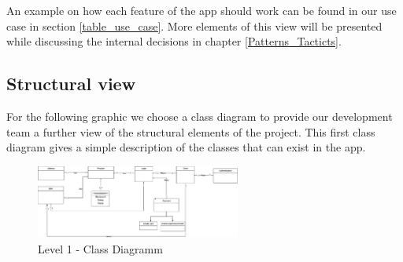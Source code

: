 An example on how each feature of the app should work can be found in our use case in section \ref{table_use_case}.
More elements of this view will be presented while discussing the internal decisions in chapter \ref{Patterns_Tacticts}. 


\subsection{Structural view}




For the following graphic we choose a \gls{class diagram} to provide our development team a further view of the
structural elements of the project. This first class diagram gives a simple description of the classes that can
exist in the app.

\begin{figure}[H]
    \centering
    \includegraphics[width=0.6\textwidth]{assets/simple_classes_CD.jpg}
    \caption{Level 1 - Class Diagramm}
    \label{fig:simple_class_diagram}
\end{figure}


 
